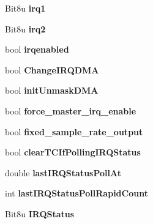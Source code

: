 \begin{DoxyCompactItemize}
\item 
\hypertarget{structGFGus_a77dbee069455b135eb03cb0506ca7183}{Bit8u {\bfseries irq1}}\label{structGFGus_a77dbee069455b135eb03cb0506ca7183}

\item 
\hypertarget{structGFGus_aee8e865cfc001eee4b684a9f0aaf13c2}{Bit8u {\bfseries irq2}}\label{structGFGus_aee8e865cfc001eee4b684a9f0aaf13c2}

\item 
\hypertarget{structGFGus_a880603316b40656dcd6a0a66b31de0e1}{bool {\bfseries irqenabled}}\label{structGFGus_a880603316b40656dcd6a0a66b31de0e1}

\item 
\hypertarget{structGFGus_a886bb283bcdd3fed729cc9d0a227e215}{bool {\bfseries Change\-I\-R\-Q\-D\-M\-A}}\label{structGFGus_a886bb283bcdd3fed729cc9d0a227e215}

\item 
\hypertarget{structGFGus_addf5f696942ccec4aaee7c90fad1666f}{bool {\bfseries init\-Unmask\-D\-M\-A}}\label{structGFGus_addf5f696942ccec4aaee7c90fad1666f}

\item 
\hypertarget{structGFGus_a6f0abbfeda3210c8815df893b4050932}{bool {\bfseries force\-\_\-master\-\_\-irq\-\_\-enable}}\label{structGFGus_a6f0abbfeda3210c8815df893b4050932}

\item 
\hypertarget{structGFGus_ad2d7df4869b08f0d511c27c825f875c3}{bool {\bfseries fixed\-\_\-sample\-\_\-rate\-\_\-output}}\label{structGFGus_ad2d7df4869b08f0d511c27c825f875c3}

\item 
\hypertarget{structGFGus_a7f5277e4f45d370accfe2d3bead2bc4e}{bool {\bfseries clear\-T\-C\-If\-Polling\-I\-R\-Q\-Status}}\label{structGFGus_a7f5277e4f45d370accfe2d3bead2bc4e}

\item 
\hypertarget{structGFGus_af0b298312f809cdbee6142fde65bbe1c}{double {\bfseries last\-I\-R\-Q\-Status\-Poll\-At}}\label{structGFGus_af0b298312f809cdbee6142fde65bbe1c}

\item 
\hypertarget{structGFGus_a7cf53be90ec9d8dfb4b22b3e004fd9cd}{int {\bfseries last\-I\-R\-Q\-Status\-Poll\-Rapid\-Count}}\label{structGFGus_a7cf53be90ec9d8dfb4b22b3e004fd9cd}

\item 
\hypertarget{structGFGus_af238c9e873d19d61f046063d83f111d1}{Bit8u {\bfseries I\-R\-Q\-Status}}\label{structGFGus_af238c9e873d19d61f046063d83f111d1}


\end{DoxyCompactItemize}
